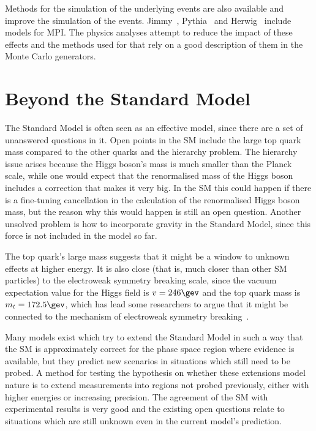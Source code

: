 Methods for the simulation of the underlying events
are also available and improve the simulation of the events.
Jimmy~\cite{jimmy}, Pythia~\cite{pythia} and Herwig~\cite{herwig1,herwig2} include models for MPI.
The physics analyses attempt to reduce the impact of these
effects and the methods used for that rely on a good description of them in the Monte Carlo generators.

\section{Beyond the Standard Model}
\label{sec:theory_bsm}

The Standard Model is often seen as an effective model, since there are a set of unanswered questions in it. Open points in the SM include the large top quark mass
compared to the other quarks and the hierarchy problem. The hierarchy issue arises because the Higgs boson's mass is much smaller than the Planck scale, while one would expect
that the renormalised mass of the Higgs boson includes a correction that makes it very big. In the SM this could happen if there is a fine-tuning cancellation in the calculation
of the renormalised Higgs boson mass, but the reason why this would happen is still an open question.
Another unsolved problem is how to incorporate gravity in the Standard Model, since this force is not included in the model so far.

The top quark's large mass suggests that it might be a window to unknown effects at higher energy. It is also close (that is, much closer than other
SM particles) to the electroweak symmetry breaking scale,
since the vacuum expectation value for the Higgs field is $v = 246\gev$ and the top quark mass is $m_t = 172.5\gev$, which has lead some researchers
to argue that it might be connected to the mechanism of electroweak symmetry breaking~\cite{topcouplings}.

Many models exist which try to extend the Standard Model in such a way that the SM is approximately correct for the phase space region where evidence is available,
but they predict new scenarios in situations which still need to be probed. A method for testing the hypothesis on whether these extensions model nature is
to extend measurements into regions not probed previously, either with higher energies or increasing precision.
The agreement of the SM with experimental results is very good and the existing open questions relate to situations which
are still unknown even in the current model's prediction.

